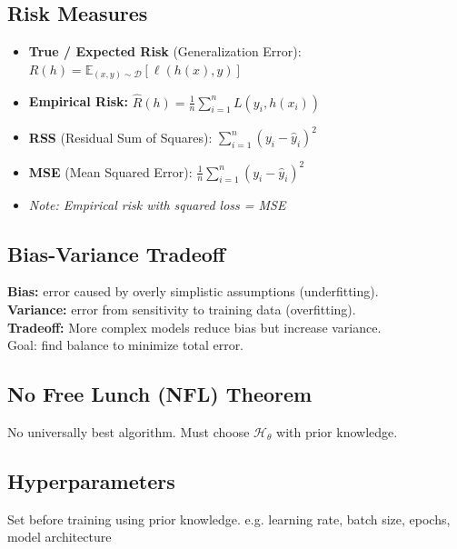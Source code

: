 \subsection{Risk Measures}
\begin{itemize}
    \item \textbf{True / Expected Risk} (Generalization Error): $R(h) = \mathbb{E}_{(x, y) \sim \mathcal{D}}[\ell(h(x), y)]$
    \item \textbf{Empirical Risk:} $\hat{R}(h) = \frac{1}{n}\sum_{i=1}^n L(y_i, h(x_i))$
    \item \textbf{RSS} (Residual Sum of Squares): $\sum_{i=1}^n (y_i - \hat{y}_i)^2$
    \item \textbf{MSE} (Mean Squared Error): $\frac{1}{n}\sum_{i=1}^n (y_i - \hat{y}_i)^2$
    \item[] \textit{Note: Empirical risk with squared loss = MSE}
\end{itemize}

\subsection{Bias-Variance Tradeoff}
\textbf{Bias:} error caused by overly simplistic assumptions (underfitting). \\
\textbf{Variance:} error from sensitivity to training data (overfitting). \\
\textbf{Tradeoff:} More complex models reduce bias but increase variance. \\
Goal: find balance to minimize total error.

\subsection{No Free Lunch (NFL) Theorem}
No universally best algorithm. Must choose $\mathcal{H}_\theta$ with prior knowledge.

\subsection{Hyperparameters}
Set before training using prior knowledge. e.g. learning rate, batch size, epochs, model architecture

